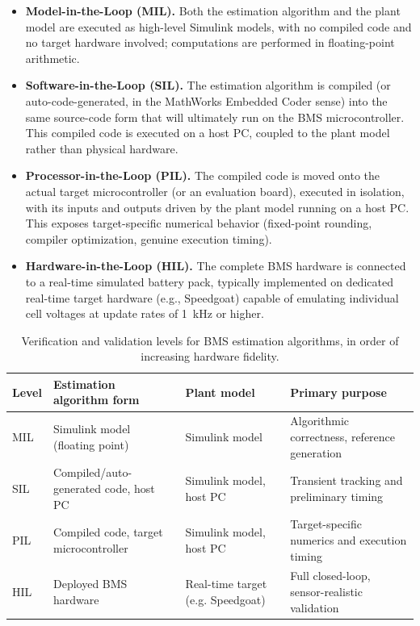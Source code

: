 \begin{itemize}
	\item \textbf{Model-in-the-Loop (MIL).} Both the estimation algorithm and the plant model are executed as high-level Simulink models, with no compiled code and no target hardware involved; computations are performed in floating-point arithmetic.
	\item \textbf{Software-in-the-Loop (SIL).} The estimation algorithm is compiled (or auto-code-generated, in the MathWorks Embedded Coder sense) into the same source-code form that will ultimately run on the BMS microcontroller. This compiled code is executed on a host PC, coupled to the plant model rather than physical hardware.
	\item \textbf{Processor-in-the-Loop (PIL).} The compiled code is moved onto the actual target microcontroller (or an evaluation board), executed in isolation, with its inputs and outputs driven by the plant model running on a host PC. This exposes target-specific numerical behavior (fixed-point rounding, compiler optimization, genuine execution timing).
	\item \textbf{Hardware-in-the-Loop (HIL).} The complete BMS hardware is connected to a real-time simulated battery pack, typically implemented on dedicated real-time target hardware (e.g., Speedgoat) capable of emulating individual cell voltages at update rates of 1~kHz or higher.
\end{itemize}

\begin{table}[htbp]
	\centering
	\caption{Verification and validation levels for BMS estimation algorithms, in order of increasing hardware fidelity.}
	\label{tab:xil_levels}
	\renewcommand{\arraystretch}{1.3}
	\begin{tabularx}{\textwidth}{@{}l X X X@{}}
		\toprule
		\textbf{Level} & \textbf{Estimation algorithm form} & \textbf{Plant model} & \textbf{Primary purpose} \\
		\midrule
		MIL & Simulink model (floating point) & Simulink model & Algorithmic correctness, reference generation \\
		SIL & Compiled/auto-generated code, host PC & Simulink model, host PC & Transient tracking and preliminary timing \\
		PIL & Compiled code, target microcontroller & Simulink model, host PC & Target-specific numerics and execution timing \\
		HIL & Deployed BMS hardware & Real-time target (e.g. Speedgoat) & Full closed-loop, sensor-realistic validation \\
		\bottomrule
	\end{tabularx}
\end{table}

